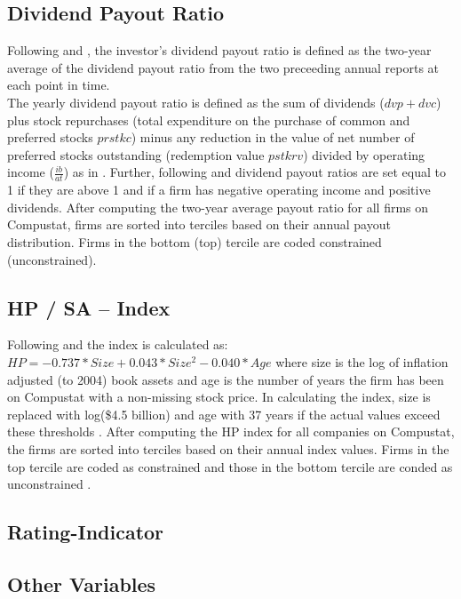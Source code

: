 \documentclass[12pt]{article}
\begin{document}
\begin{appendices}
	\subsection*{Dividend Payout Ratio}
	\noindent Following \citet[p.119]{Khatami2014} and \citet[p.1789]{Almeida2004}, the investor's dividend payout ratio is defined as the two-year average of the dividend payout ratio from the two preceeding annual reports at each point in time.\\
	The yearly dividend payout ratio is defined as the sum of dividends ($dvp+dvc$) plus stock repurchases (total expenditure on the purchase of common and preferred stocks $prstkc$) minus any reduction in the value of net number of preferred stocks outstanding (redemption value $pstkrv$) divided by operating income ($\frac{ib}{at}$) as in \citet[p.369]{Jagannathan2000}. Further, following \citet[p.119]{Khatami2014} and \citet[p.1923]{hadlock2010} dividend payout ratios are set equal to 1 if they are above 1 and if a firm has negative operating income and positive dividends. After computing the two-year average payout ratio for all firms on Compustat, firms are sorted into terciles based on their annual payout distribution. Firms in the bottom (top) tercile are coded constrained (unconstrained). 

	\subsection*{HP / SA -- Index}
	\noindent Following \citet[p.1929]{hadlock2010} and \citet[p.119]{Khatami2014} the index is calculated as: $HP=-0.737*Size+0.043*Size^{2}-0.040*Age$ where size is the log of inflation adjusted (to 2004) book assets and age is the number of years the firm has been on Compustat with a non-missing stock price. In calculating the index, size is replaced with log(\$4.5 billion) and age with 37 years if the actual values exceed these thresholds \citep[p.1929]{hadlock2010}. After computing the HP index for all companies on Compustat, the firms are sorted into terciles based on their annual index values. Firms in the top tercile are coded as constrained and those in the bottom tercile are conded as unconstrained \citep[p.38]{Farre-mensa2013}.
	\pagebreak

	\subsection{Rating-Indicator}
	\subsection*{Other Variables}


\end{appendices}
\end{document}
